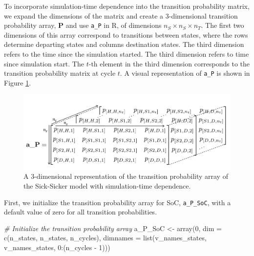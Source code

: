 \documentclass[
]{article}
\newenvironment{Shaded}{\begin{snugshade}}{\end{snugshade}}
\newcommand{\AttributeTok}[1]{\textcolor[rgb]{0.77,0.63,0.00}{#1}}
\newcommand{\CommentTok}[1]{\textcolor[rgb]{0.56,0.35,0.01}{\textit{#1}}}
\newcommand{\DecValTok}[1]{\textcolor[rgb]{0.00,0.00,0.81}{#1}}
\newcommand{\FunctionTok}[1]{\textcolor[rgb]{0.00,0.00,0.00}{#1}}
\newcommand{\NormalTok}[1]{#1}
\newcommand{\OtherTok}[1]{\textcolor[rgb]{0.56,0.35,0.01}{#1}}
\newcommand{\SpecialCharTok}[1]{\textcolor[rgb]{0.00,0.00,0.00}{#1}}
\begin{document}
To incorporate simulation-time dependence into the transition probability matrix, we expand the dimensions of the matrix and create a 3-dimensional transition probability array, \(\mathbf{P}\) and use \texttt{a\_P} in R, of dimensions \(n_S \times n_S \times n_T\). The first two dimensions of this array correspond to transitions between states, where the rows determine departing states and columns destination states. The third dimension refers to the time since the simulation started. The third dimension refers to time since simulation start. The \(t\)-th element in the third dimension corresponds to the transition probability matrix at cycle \(t\). A visual representation of \texttt{a\_P} is shown in Figure \ref{fig:Array-Time-Dependent}.

\begin{figure}[H]

{\centering \includegraphics[width=1\linewidth]{figs/Figure 1 - 3D-state-transition-array-sick-sicker-without-tunnels} 

}

\caption{A 3-dimensional representation of the transition probability array of the Sick-Sicker model with simulation-time dependence.}\label{fig:Array-Time-Dependent}
\end{figure}

First, we initialize the transition probability array for SoC, \texttt{a\_P\_SoC}, with a default value of zero for all transition probabilities.

\begin{Shaded}
\begin{Highlighting}[]
\CommentTok{\# Initialize the transition probability array}
\NormalTok{a\_P\_SoC }\OtherTok{\textless{}{-}} \FunctionTok{array}\NormalTok{(}\DecValTok{0}\NormalTok{, }\AttributeTok{dim =} \FunctionTok{c}\NormalTok{(n\_states, n\_states, n\_cycles),}
              \AttributeTok{dimnames =} \FunctionTok{list}\NormalTok{(v\_names\_states, v\_names\_states, }\DecValTok{0}\SpecialCharTok{:}\NormalTok{(n\_cycles }\SpecialCharTok{{-}} \DecValTok{1}\NormalTok{)))}
\end{Highlighting}
\end{Shaded}
\end{document}

